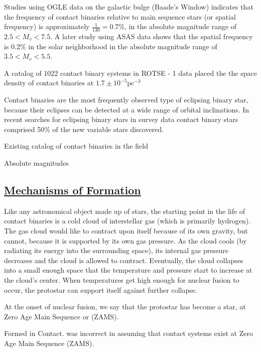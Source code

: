 \documentclass[12pt]{article} %
\numberwithin{equation}{section} %
\begin{document}
 \citep{rucinski1998contact} Studies using OGLE data on the galactic bulge (Baade's Window) indicates that the frequency of contact binaries relative to main sequence stars (or spatial frequency) is approximately $\frac{1}{130} = 0.7\%$, in the absolute magnitude range of $2.5 < M_{v} < 7.5$. A later study using ASAS data shows that the spatial frequency is 0.2\% in the solar neighborhood \citep{rucinski2006luminosity} in the absolute magnitude range of $3.5 < M_{v} < 5.5$.

A catalog of 1022 contact binary systems in ROTSE - 1 data placed the the space density of contact binaries at $1.7 \pm 10^{-5} \text{pc}^{-3}$ \citep{gettel2006catalog}
 
Contact binaries are the most frequently observed type of eclipsing binary star, because their eclipses can be detected at a wide range of orbital inclinations. In recent searches for eclipsing binary stars in survey data \citep{drake2014catalina} contact binary stars comprised 50\% of the new variable stars discovered. 

Existing catalog of contact binaries in the field \citep{pribulla2003catalogue}

Absolute magnitudes \citep{rucinski1997absolute} 

\subsection[Mechanisms of Formation]{\hyperlink{toc}{Mechanisms of Formation}}

Like any astronomical object made up of stars, the starting point in the life of contact binaries is a cold cloud of interstellar gas (which is primarily hydrogen). The gas cloud would like to contract upon itself because of its own gravity, but cannot, because it is supported by its own gas pressure. As the cloud cools (by radiating its energy into the surrounding space), its internal gas pressure decreases and the cloud is allowed to contract. Eventually, the cloud collapses into a small enough space that the temperature and pressure start to increase at the cloud's center. When temperatures get high enough for nuclear fusion to occur, the protostar can support itself against further collapse. 

At the onset of nuclear fusion, we say that the protostar has become a star, at Zero Age Main Sequence or (ZAMS).  
 
Formed in Contact. \citet{lucy1968structure} was incorrect in assuming that contact systems exist at Zero Age Main Sequence (ZAMS).
\end{document}
